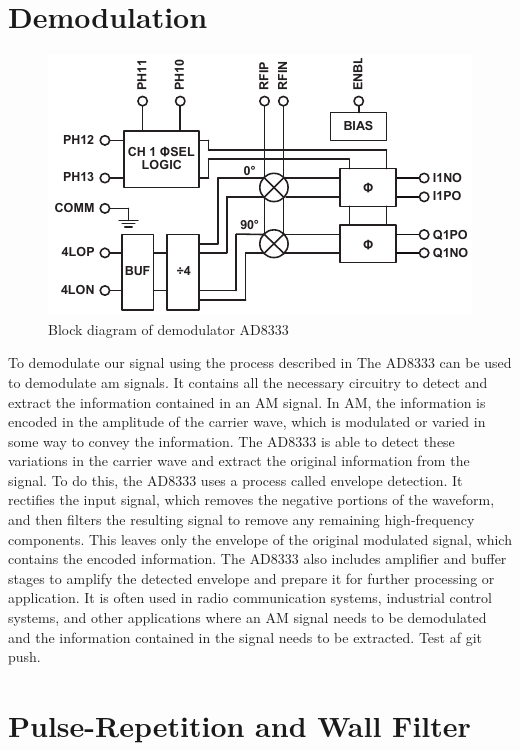 \section{Demodulation}
\begin{figure}[htbp]
	\centering
	\includegraphics[width=.8\textwidth]{Figures/3_ad8333_block.pdf}
	\caption{Block diagram of demodulator AD8333 \cite{AD8333}}
	\label{fig:3_demodulator_block}
\end{figure}
To demodulate our signal using the process described in The AD8333\cite{AD8333} can be used to demodulate \gls{am} signals. It contains all the necessary circuitry to detect and extract the information contained in an AM signal. In AM, the information is encoded in the amplitude of the carrier wave, which is modulated or varied in some way to convey the information. The AD8333 is able to detect these variations in the carrier wave and extract the original information from the signal. To do this, the AD8333 uses a process called envelope detection. It rectifies the input signal, which removes the negative portions of the waveform, and then filters the resulting signal to remove any remaining high-frequency components. This leaves only the envelope of the original modulated signal, which contains the encoded information. The AD8333 also includes amplifier and buffer stages to amplify the detected envelope and prepare it for further processing or application. It is often used in radio communication systems, industrial control systems, and other applications where an AM signal needs to be demodulated and the information contained in the signal needs to be extracted. Test af git push.

\section{Pulse-Repetition and Wall Filter}
